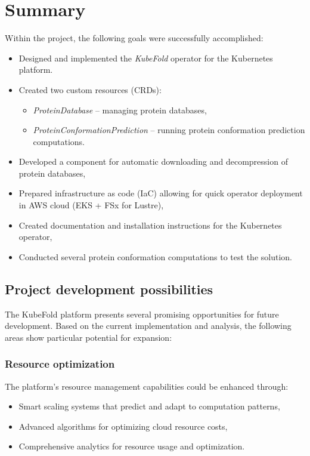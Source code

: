\chapter{Summary}

Within the project, the following goals were successfully accomplished:
\begin{itemize}
    \item Designed and implemented the \textit{KubeFold} operator for the Kubernetes platform.
    \item Created two custom resources (CRDs):
    \begin{itemize}
        \item \textit{ProteinDatabase} – managing protein databases,
        \item \textit{ProteinConformationPrediction} – running protein conformation prediction computations.
    \end{itemize}
    \item Developed a component for automatic downloading and decompression of protein databases,
    \item Prepared infrastructure as code (IaC) allowing for quick operator deployment in AWS cloud (EKS + FSx for Lustre),
    \item Created documentation and installation instructions for the Kubernetes operator,
    \item Conducted several protein conformation computations to test the solution.
\end{itemize}


\section{Project development possibilities}

The KubeFold platform presents several promising opportunities for future development.
Based on the current implementation and analysis, the following areas show particular potential for expansion:

\subsection{Resource optimization}
The platform's resource management capabilities could be enhanced through:
\begin{itemize}
    \item Smart scaling systems that predict and adapt to computation patterns,
    \item Advanced algorithms for optimizing cloud resource costs,
    \item Comprehensive analytics for resource usage and optimization.
\end{itemize}

